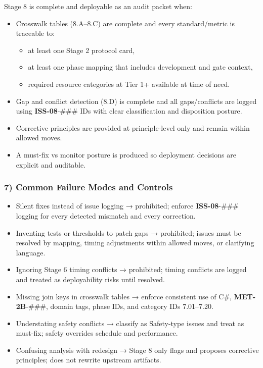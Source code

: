 \documentclass[10pt]{article}
\begin{document}
Stage 8 is complete and deployable as an audit packet when:

\begin{itemize}
\item Crosswalk tables (8.A–8.C) are complete and every standard/metric is traceable to:
  \begin{itemize}
  \item at least one Stage 2 protocol card,
  \item at least one phase mapping that includes development and gate context,
  \item required resource categories at Tier 1+ available at time of need.
  \end{itemize}
\item Gap and conflict detection (8.D) is complete and all gaps/conflicts are logged using \textbf{ISS-08}-\#\#\# IDs with clear classification and disposition posture.
\item Corrective principles are provided at principle-level only and remain within allowed moves.
\item A must-fix vs monitor posture is produced so deployment decisions are explicit and auditable.
\end{itemize}

\subsubsection*{7) Common Failure Modes and Controls}

\begin{itemize}
\item Silent fixes instead of issue logging → prohibited; enforce \textbf{ISS-08}-\#\#\# logging for every detected mismatch and every correction.
\item Inventing tests or thresholds to patch gaps → prohibited; issues must be resolved by mapping, timing adjustments within allowed moves, or clarifying language.
\item Ignoring Stage 6 timing conflicts → prohibited; timing conflicts are logged and treated as deployability risks until resolved.
\item Missing join keys in crosswalk tables → enforce consistent use of C\#, \textbf{MET-2B}-\#\#\#, domain tags, phase IDs, and category IDs 7.01–7.20.
\item Understating safety conflicts → classify as Safety-type issues and treat as must-fix; safety overrides schedule and performance.
\item Confusing analysis with redesign → Stage 8 only flags and proposes corrective principles; does not rewrite upstream artifacts.
\end{itemize}
\end{document}
